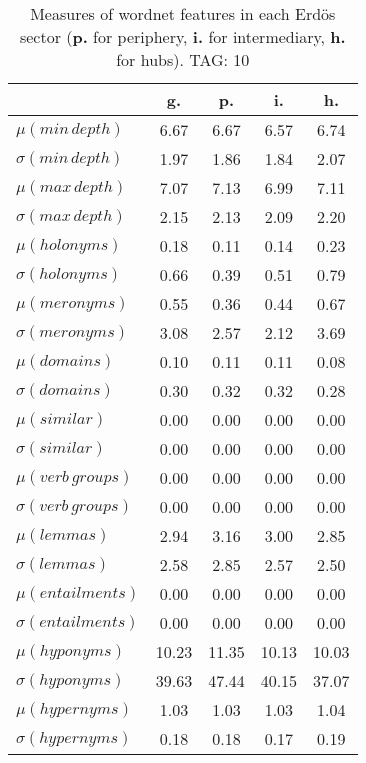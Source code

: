 \begin{table}[h!]
\begin{center}
\begin{tabular}{| l | c | c | c | c |}\hline
 & g. & p. & i. & h. \\\hline
$\mu(min\,depth)$ & 6.67  & 6.67  & 6.57  & 6.74 \\\hline
$\sigma(min\,depth)$ & 1.97  & 1.86  & 1.84  & 2.07 \\\hline
$\mu(max\,depth)$ & 7.07  & 7.13  & 6.99  & 7.11 \\\hline
$\sigma(max\,depth)$ & 2.15  & 2.13  & 2.09  & 2.20 \\\hline
$\mu(holonyms)$ & 0.18  & 0.11  & 0.14  & 0.23 \\\hline
$\sigma(holonyms)$ & 0.66  & 0.39  & 0.51  & 0.79 \\\hline
$\mu(meronyms)$ & 0.55  & 0.36  & 0.44  & 0.67 \\\hline
$\sigma(meronyms)$ & 3.08  & 2.57  & 2.12  & 3.69 \\\hline
$\mu(domains)$ & 0.10  & 0.11  & 0.11  & 0.08 \\\hline
$\sigma(domains)$ & 0.30  & 0.32  & 0.32  & 0.28 \\\hline
$\mu(similar)$ & 0.00  & 0.00  & 0.00  & 0.00 \\\hline
$\sigma(similar)$ & 0.00  & 0.00  & 0.00  & 0.00 \\\hline
$\mu(verb\,groups)$ & 0.00  & 0.00  & 0.00  & 0.00 \\\hline
$\sigma(verb\,groups)$ & 0.00  & 0.00  & 0.00  & 0.00 \\\hline
$\mu(lemmas)$ & 2.94  & 3.16  & 3.00  & 2.85 \\\hline
$\sigma(lemmas)$ & 2.58  & 2.85  & 2.57  & 2.50 \\\hline
$\mu(entailments)$ & 0.00  & 0.00  & 0.00  & 0.00 \\\hline
$\sigma(entailments)$ & 0.00  & 0.00  & 0.00  & 0.00 \\\hline
$\mu(hyponyms)$ & 10.23  & 11.35  & 10.13  & 10.03 \\\hline
$\sigma(hyponyms)$ & 39.63  & 47.44  & 40.15  & 37.07 \\\hline
$\mu(hypernyms)$ & 1.03  & 1.03  & 1.03  & 1.04 \\\hline
$\sigma(hypernyms)$ & 0.18  & 0.18  & 0.17  & 0.19 \\\hline
\end{tabular}
\caption{Measures of wordnet features in each Erd\"os sector ({{\bf p.}} for periphery, {{\bf i.}} for intermediary, {{\bf h.}} for hubs). TAG: 10}
\end{center}
\end{table}